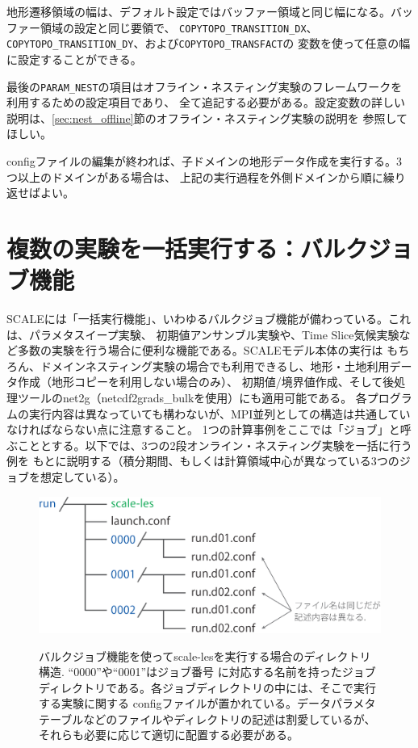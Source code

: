地形遷移領域の幅は、デフォルト設定ではバッファー領域と同じ幅になる。バッファー領域の設定と同じ要領で、
\verb|COPYTOPO_TRANSITION_DX|、\verb|COPYTOPO_TRANSITION_DY|、および\verb|COPYTOPO_TRANSFACT|の
変数を使って任意の幅に設定することができる。

最後の\verb|PARAM_NEST|の項目はオフライン・ネスティング実験のフレームワークを利用するための設定項目であり、
全て追記する必要がある。設定変数の詳しい説明は、\ref{sec:nest_offline}節のオフライン・ネスティング実験の説明を
参照してほしい。

configファイルの編集が終われば、子ドメインの地形データ作成を実行する。3つ以上のドメインがある場合は、
上記の実行過程を外側ドメインから順に繰り返せばよい。



\section{複数の実験を一括実行する：バルクジョブ機能} \label{sec:bulkjob}

SCALEには「一括実行機能」、いわゆるバルクジョブ機能が備わっている。これは、パラメタスイープ実験、
初期値アンサンブル実験や、Time Slice気候実験など多数の実験を行う場合に便利な機能である。SCALEモデル本体の実行は
もちろん、ドメインネスティング実験の場合でも利用できるし、地形・土地利用データ作成（地形コピーを利用しない場合のみ）、
初期値/境界値作成、そして後処理ツールのnet2g（netcdf2grads\_bulkを使用）にも適用可能である。
各プログラムの実行内容は異なっていても構わないが、MPI並列としての構造は共通していなければならない点に注意すること。
1つの計算事例をここでは「ジョブ」と呼ぶこととする。以下では、3つの2段オンライン・ネスティング実験を一括に行う例を
もとに説明する（積分期間、もしくは計算領域中心が異なっている3つのジョブを想定している）。


\begin{figure}[t]
\begin{center}
  \includegraphics[width=0.6\hsize]{./figure/bulkjob_directory_structure.eps}\\
  \caption{バルクジョブ機能を使ってscale-lesを実行する場合のディレクトリ構造. ``0000''や``0001''はジョブ番号
           に対応する名前を持ったジョブディレクトリである。各ジョブディレクトリの中には、そこで実行する実験に関する
           configファイルが置かれている。データパラメタテーブルなどのファイルやディレクトリの記述は割愛しているが、
           それらも必要に応じて適切に配置する必要がある。}
  \label{fig_bulkjob}
\end{center}
\end{figure}


